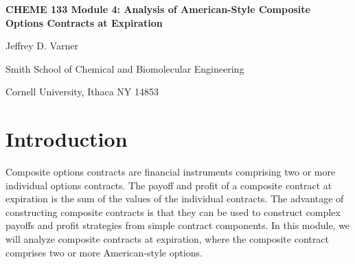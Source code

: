 \documentclass[11pt]{article}
\theoremstyle{definition}
\begin{document}
{\par\centering\textbf{\Large CHEME 133 Module 4: Analysis of American-Style Composite Options Contracts at Expiration}}
\vspace{0.2in}
{\par \centering \large{Jeffrey D. Varner}}
\vspace{0.05in}
{\par \centering \large{Smith School of Chemical and Biomolecular Engineering}}
{\par \centering \large{Cornell University, Ithaca NY 14853}}

\date{}
\thispagestyle{empty}

\setcounter{page}{1}

\section*{Introduction}
Composite options contracts are financial instruments comprising two or more individual options contracts. 
The payoff and profit of a composite contract at expiration is the sum of the values of the individual contracts. 
The advantage of constructing composite contracts is that they can be used to construct complex payoffs and profit strategies 
from simple contract components. In this module, we will analyze composite contracts at expiration, 
where the composite contract comprises two or more American-style options.
\end{document}
